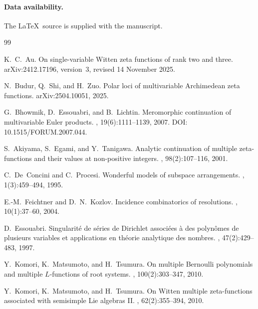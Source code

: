\documentclass[11pt]{article}
\begin{document}
\paragraph{Data availability.}
The \LaTeX\ source is supplied with the manuscript.
\begingroup
\footnotesize
\begin{thebibliography}{99}


K.~C.~Au.
\newblock On single-variable Witten zeta functions of rank two and three.
\newblock arXiv:2412.17196, version~3, revised 14 November 2025.

N.~Budur, Q.~Shi, and H.~Zuo.
\newblock Polar loci of multivariable Archimedean zeta functions.
\newblock arXiv:2504.10051, 2025.

G.~Bhowmik, D.~Essouabri, and B.~Lichtin.
\newblock Meromorphic continuation of multivariable Euler products.
, 19(6):1111--1139, 2007.
\newblock DOI: 10.1515/FORUM.2007.044.

S.~Akiyama, S.~Egami, and Y.~Tanigawa.
\newblock Analytic continuation of multiple zeta-functions and their values at
  non-positive integers.
, 98(2):107--116, 2001.

C.~De~Concini and C.~Procesi.
\newblock Wonderful models of subspace arrangements.
, 1(3):459--494, 1995.


E.-M.~Feichtner and D.~N.~Kozlov.
\newblock Incidence combinatorics of resolutions.
, 10(1):37--60, 2004.

D.~Essouabri.
\newblock Singularit\'e de s\'eries de {Dirichlet} associ\'ees \`a des
  polyn\^omes de plusieurs variables et applications en th\'eorie analytique
  des nombres.
, 47(2):429--483, 1997.

Y.~Komori, K.~Matsumoto, and H.~Tsumura.
\newblock On multiple Bernoulli polynomials and multiple {$L$}-functions of
  root systems.
,
  100(2):303--347, 2010.

Y.~Komori, K.~Matsumoto, and H.~Tsumura.
\newblock On Witten multiple zeta-functions associated with semisimple Lie
  algebras {II}.
, 62(2):355--394,
  2010.


\end{thebibliography}
\end{document}
